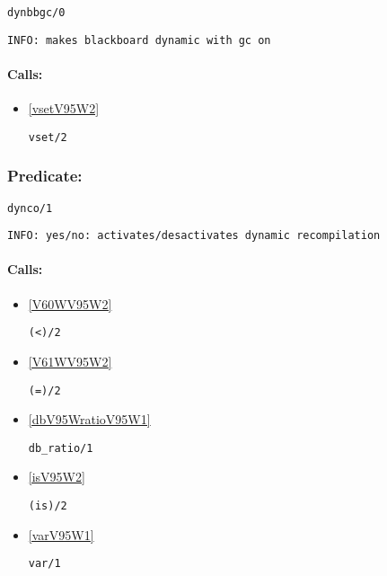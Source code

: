 \begin{verbatim}
dynbbgc/0
\end{verbatim}

{\small \begin{verbatim}
INFO: makes blackboard dynamic with gc on

\end{verbatim}}
\paragraph{Calls:} 
\begin{itemize}
\item \ref{vsetV95W2} 
\begin{verbatim}
vset/2
\end{verbatim}

\end{itemize}

\subsubsection{Predicate:} \label{dyncoV95W1}

\begin{verbatim}
dynco/1
\end{verbatim}

{\small \begin{verbatim}
INFO: yes/no: activates/desactivates dynamic recompilation

\end{verbatim}}
\paragraph{Calls:} 
\begin{itemize}
\item \ref{V60WV95W2} 
\begin{verbatim}
(<)/2
\end{verbatim}

\item \ref{V61WV95W2} 
\begin{verbatim}
(=)/2
\end{verbatim}

\item \ref{dbV95WratioV95W1} 
\begin{verbatim}
db_ratio/1
\end{verbatim}

\item \ref{isV95W2} 
\begin{verbatim}
(is)/2
\end{verbatim}

\item \ref{varV95W1} 
\begin{verbatim}
var/1
\end{verbatim}

\end{itemize}
